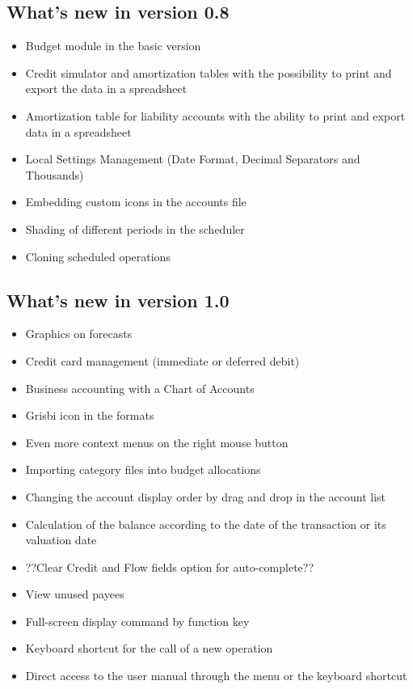 \subsection{What's new in version 0.8}

\begin{itemize}%
	\item Budget module in the basic version
	\item Credit simulator and amortization tables with the possibility to print and export the data in a spreadsheet
	\item Amortization table for liability accounts with the ability to print and export data in a spreadsheet
	\item Local Settings Management (Date Format, Decimal Separators and Thousands)
	\item Embedding custom icons in the accounts file
	\item Shading of different periods in the scheduler
	\item Cloning scheduled operations
\end{itemize}


\newpage

\subsection{What's new in version 1.0}

\begin{itemize}%
	\item Graphics on forecasts
	\item Credit card management (immediate or deferred debit)
	\item Business accounting with a Chart of Accounts
	\item Grisbi icon in the   formats 
	\item Even more context menus on the right mouse button
	\item Importing category files into budget allocations
	\item Changing the account display order by drag and drop in the account list
	\item Calculation of the balance according to the date of the transaction or its valuation date
	\item ??Clear Credit and Flow fields option for auto-complete??
	\item View unused payees
	\item Full-screen display command by function key 
	\item Keyboard shortcut   for the call of a new operation
	\item Direct access to the user manual through the menu  or the keyboard shortcut  
\end{itemize}

